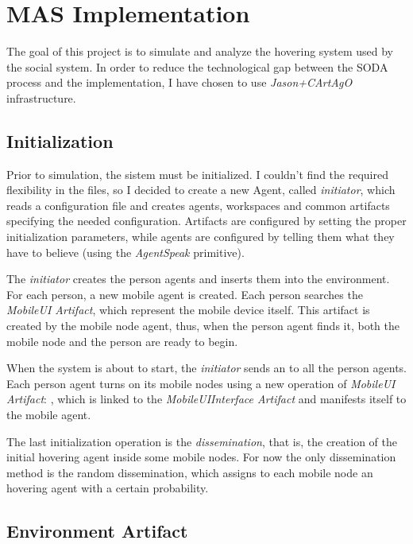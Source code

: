 \section{MAS Implementation}
\label{sec:implementation}

The goal of this project is to simulate and analyze the
hovering system used by the social system. In order to
reduce the technological gap between the SODA process and
the implementation, I have chosen to use
\emph{Jason+CArtAgO}\cite{cartago,jaslide,cartex} infrastructure.

\subsection{Initialization}

Prior to simulation, the sistem must be initialized. I couldn't find the
required flexibility in the  files, so I decided to create a new
Agent, called \emph{initiator}, which reads a configuration file and creates
agents, workspaces and common artifacts specifying the needed configuration.
Artifacts are configured by setting the proper initialization parameters, while
agents are configured by telling them what they have to believe (using the
\emph{AgentSpeak}  primitive).

The \emph{initiator} creates the person agents and inserts them into the
environment. For each person, a new mobile agent is created. Each person
searches the \emph{MobileUI Artifact}, which represent the mobile device
itself. This artifact is created by the mobile node agent, thus, when the
person agent finds it, both the mobile node and the person are ready to begin.

When the system is about to start, the \emph{initiator} sends an
 to all the person agents. Each person agent turns on its
mobile nodes using a new operation of \emph{MobileUI Artifact}:
, which is linked to the \emph{MobileUIInterface Artifact}
and manifests itself to the mobile agent.

The last initialization operation is the \emph{dissemination}, that is, the
creation of the initial hovering agent inside some mobile nodes. For now the
only dissemination method is the random dissemination, which assigns to each
mobile node an hovering agent with a certain probability.

\subsection{Environment Artifact}

